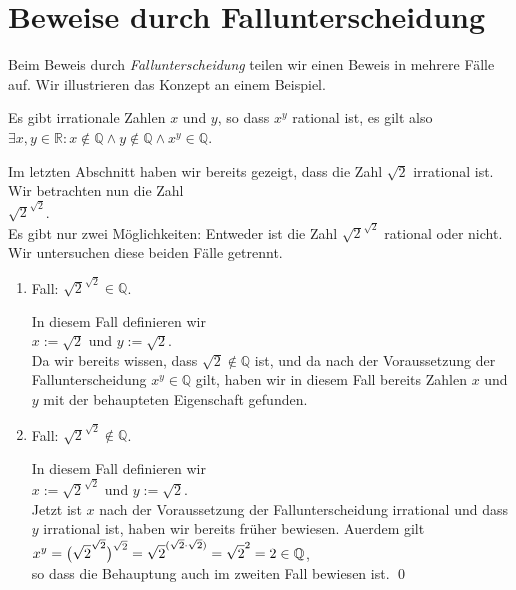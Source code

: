 \section{Beweise durch Fallunterscheidung}
Beim Beweis durch \emph{Fallunterscheidung} teilen wir einen Beweis in mehrere F\"alle auf.  Wir
illustrieren das Konzept an einem Beispiel. 

\begin{Satz}
  Es gibt irrationale Zahlen $x$ und $y$, so dass $x^y$ rational ist, es gilt also
  \\[0.2cm]
  \hspace*{1.3cm}
  $\exists x, y \in \mathbb{R}: x \not\in \mathbb{Q} \wedge y \not\in \mathbb{Q} \wedge x^y \in \mathbb{Q}$.
\end{Satz}

\proof
Im letzten Abschnitt haben wir bereits gezeigt, dass die Zahl $\sqrt{2}$ irrational ist.  Wir
betrachten nun die Zahl 
\\[0.2cm]
\hspace*{1.3cm}
$\sqrt{2}^{\sqrt{2}}$.
\\[0.2cm]
Es gibt nur zwei M\"{o}glichkeiten: Entweder ist die Zahl $\sqrt{2}^{\sqrt{2}}$ rational oder nicht.  Wir
untersuchen diese beiden F\"{a}lle getrennt.
\begin{enumerate}
\item Fall: $\sqrt{2}^{\sqrt{2}} \in \mathbb{Q}$.

      In diesem Fall definieren wir
      \\[0.2cm]
      \hspace*{1.3cm}
      $x := \sqrt{2}$ \quad und \quad $y := \sqrt{2}$.  
      \\[0.2cm]
      Da wir bereits wissen,
      dass $\sqrt{2} \not\in \mathbb{Q}$ ist, und da nach der Voraussetzung der
      Fallunterscheidung $x^y \in \mathbb{Q}$ gilt, haben wir in diesem Fall bereits Zahlen $x$ und
      $y$ mit der behaupteten Eigenschaft gefunden.
\item Fall:  $\sqrt{2}^{\sqrt{2}} \not\in \mathbb{Q}$.

      In diesem Fall definieren wir 
      \\[0.2cm]
      \hspace*{1.3cm}
      $x := \sqrt{2}^{\sqrt{2}}$ \quad und \quad $y := \sqrt{2}$.
      \\[0.2cm]
      Jetzt ist $x$ nach der Voraussetzung der Fallunterscheidung irrational und dass $y$ irrational
      ist, haben wir bereits fr\"{u}her bewiesen.  Au\3erdem gilt
      \\[0.2cm]
      \hspace*{1.3cm}
      $\displaystyle x^y = \bigl(\sqrt{2}^{\sqrt{2}}\bigr)^{\sqrt{2}} = \sqrt{2}^{(\sqrt{2} \cdot \sqrt{2})} = \sqrt{2}^{2} = 2 \in \mathbb{Q}$,
      \\[0.2cm]
      so dass die Behauptung auch im zweiten Fall bewiesen ist.  \qed
\end{enumerate}

